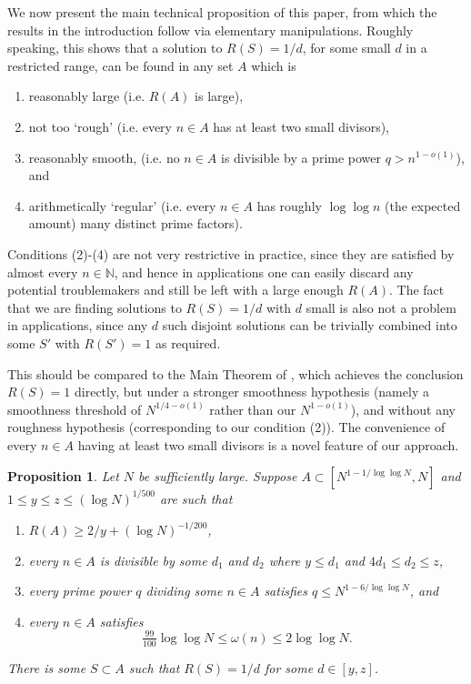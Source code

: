 \documentclass[12pt]{amsart}
\newcommand{\bbn}{\mathbb{N}}
\newtheorem{proposition}{Proposition}
\begin{document}
We now present the main technical proposition of this paper, from which the results in the introduction follow via elementary manipulations. Roughly speaking, this shows that a solution to $R(S)=1/d$, for some small $d$ in a restricted range, can be found in any set $A$ which is 
\begin{enumerate}
\item reasonably large (i.e. $R(A)$ is large),
\item not too `rough' (i.e. every $n\in A$ has at least two small divisors),
\item reasonably smooth, (i.e. no $n\in A$ is divisible by a prime power $q>n^{1-o(1)}$), and
\item arithmetically `regular' (i.e. every $n\in A$ has roughly $\log\log n$ (the expected amount) many distinct prime factors).
\end{enumerate}
Conditions (2)-(4) are not very restrictive in practice, since they are satisfied by almost every $n\in \bbn$, and hence in applications one can easily discard any potential troublemakers and still be left with a large enough $R(A)$. The fact that we are finding solutions to $R(S)=1/d$ with $d$ small is also not a problem in applications, since any $d$ such disjoint solutions can be trivially combined into some $S'$ with $R(S')=1$ as required.

This should be compared to the Main Theorem of \cite{Cr2003}, which achieves the conclusion $R(S)=1$ directly, but under a stronger smoothness hypothesis (namely a smoothness threshold of $N^{1/4-o(1)}$ rather than our $N^{1-o(1)}$), and without any roughness hypothesis (corresponding to our condition (2)). The convenience of every $n\in A$ having at least two small divisors is a novel feature of our approach.


\begin{proposition}\label{th-techmain}
Let $N$ be sufficiently large. Suppose $A\subset [N^{1-1/\log\log N},N]$ and $1\leq y\leq z\leq (\log N)^{1/500}$ are such that
\begin{enumerate}
\item $R(A)\geq 2/y+(\log N)^{-1/200}$,
\item every $n\in A$ is divisible by some $d_1$ and $d_2$ where $y\leq d_1$ and $4d_1\leq d_2\leq z$,
\item every prime power $q$ dividing some $n\in A$ satisfies $q\leq N^{1-6/\log\log N}$, and
\item every $n\in A$ satisfies
\[\tfrac{99}{100}\log\log N\leq \omega(n) \leq 2\log\log N.\]
\end{enumerate}
There is some $S\subset A$ such that $R(S)=1/d$ for some $d\in [y,z]$.
\end{proposition}
\end{document}
